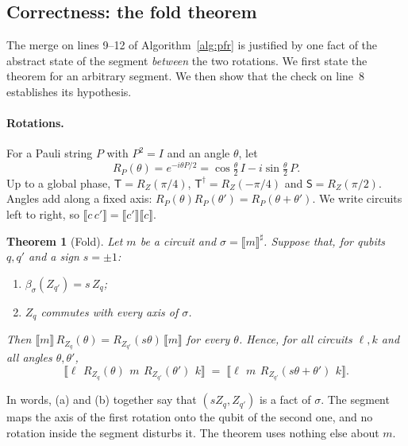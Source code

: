 \documentclass[11pt]{article}
\newtheorem{theorem}{Theorem}[section]
\theoremstyle{definition}
\theoremstyle{remark}
\newcommand{\sem}[1]{\llbracket #1 \rrbracket}
\newcommand{\abs}[1]{\llbracket #1 \rrbracket^{\sharp}}
\newcommand{\adj}{^{\dagger}}
\newcommand{\back}{\beta}
\newcommand{\gate}[1]{\mathsf{#1}}
\begin{document}
\subsection{Correctness: the fold theorem}\label{sec:fold}

The merge on lines 9--12 of Algorithm~\ref{alg:pfr} is justified by one fact of the
abstract state of the segment \emph{between} the two rotations. We first state the theorem for
an arbitrary segment. We then show that the check on line~8 establishes its hypothesis.

\paragraph{Rotations.}
For a Pauli string $P$ with $P^2 = I$ and an angle $\theta$, let
\[
  R_P(\theta) = e^{-i\theta P/2} = \cos\tfrac{\theta}{2}\, I - i \sin\tfrac{\theta}{2}\, P .
\]
Up to a global phase, $\gate T = R_{Z}(\pi/4)$, $\gate T\adj = R_Z(-\pi/4)$ and
$\gate S = R_Z(\pi/2)$. Angles add along a fixed axis:
$R_P(\theta) R_P(\theta') = R_P(\theta + \theta')$. We write circuits left to right, so
$\sem{c\, c'} = \sem{c'}\sem{c}$.

\begin{theorem}[Fold]\label{thm:fold}
Let $m$ be a circuit and $\sigma = \abs{m}$. Suppose that, for qubits $q, q'$ and a sign
$s = \pm 1$:
\begin{enumerate}[label=(\alph*), nosep]
  \item $\back_\sigma(Z_{q'}) = s\, Z_q$;
  \item $Z_q$ commutes with every axis of $\sigma$.
\end{enumerate}
Then $\sem{m}\, R_{Z_q}(\theta) = R_{Z_{q'}}(s\theta)\, \sem{m}$ for every $\theta$. Hence,
for all circuits $\ell, k$ and all angles $\theta, \theta'$,
\[
  \sem{\ell\ \, R_{Z_q}(\theta)\ \, m\ \, R_{Z_{q'}}(\theta')\ \, k}
  \;=\;
  \sem{\ell\ \, m\ \, R_{Z_{q'}}(s\theta + \theta')\ \, k} .
\]
\end{theorem}

In words, (a) and (b) together say that $(s Z_q, Z_{q'})$ is a fact of $\sigma$. The segment
maps the axis of the first rotation onto the qubit of the second one, and no rotation inside
the segment disturbs it. The theorem uses nothing else about $m$.
\end{document}

